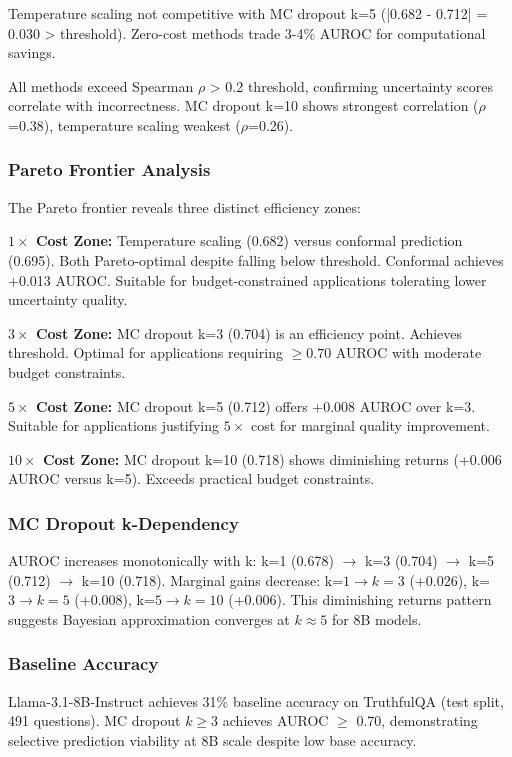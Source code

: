 Temperature scaling not competitive with MC dropout k=5 (|0.682 - 0.712| = 0.030 > threshold). Zero-cost methods trade 3-4\% AUROC for computational savings.

All methods exceed Spearman $\rho$ > 0.2 threshold, confirming uncertainty scores correlate with incorrectness. MC dropout k=10 shows strongest correlation ($\rho$=0.38), temperature scaling weakest ($\rho$=0.26).

\subsubsection{Pareto Frontier Analysis}

The Pareto frontier reveals three distinct efficiency zones:

\textbf{$1\times$ Cost Zone:} Temperature scaling (0.682) versus conformal prediction (0.695). Both Pareto-optimal despite falling below threshold. Conformal achieves +0.013 AUROC. Suitable for budget-constrained applications tolerating lower uncertainty quality.

\textbf{$3\times$ Cost Zone:} MC dropout k=3 (0.704) is an efficiency point. Achieves threshold. Optimal for applications requiring $\geq 0.70$ AUROC with moderate budget constraints.

\textbf{$5\times$ Cost Zone:} MC dropout k=5 (0.712) offers +0.008 AUROC over k=3. Suitable for applications justifying $5\times$ cost for marginal quality improvement.

\textbf{$10\times$ Cost Zone:} MC dropout k=10 (0.718) shows diminishing returns (+0.006 AUROC versus k=5). Exceeds practical budget constraints.

\subsubsection{MC Dropout k-Dependency}

AUROC increases monotonically with k: k=1 (0.678) $\rightarrow$ k=3 (0.704) $\rightarrow$ k=5 (0.712) $\rightarrow$ k=10 (0.718). Marginal gains decrease: k=$1\rightarrow k=3$ (+0.026), k=$3\rightarrow k=5$ (+0.008), k=$5\rightarrow k=10$ (+0.006). This diminishing returns pattern suggests Bayesian approximation converges at $k\approx 5$ for 8B models.

\subsubsection{Baseline Accuracy}

Llama-3.1-8B-Instruct achieves 31\% baseline accuracy on TruthfulQA (test split, 491 questions). MC dropout $k\geq 3$ achieves AUROC $\geq$ 0.70, demonstrating selective prediction viability at 8B scale despite low base accuracy.
